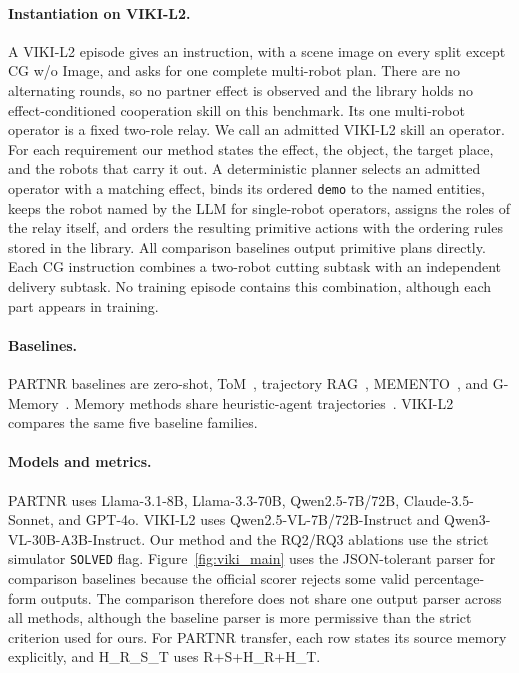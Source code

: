\documentclass{article}
\theoremstyle{plain}
\theoremstyle{definition}
\theoremstyle{remark}
\begin{document}
\paragraph{Instantiation on VIKI-L2.}
A VIKI-L2 episode gives an instruction, with a scene image on every split except CG w/o Image, and asks for one complete multi-robot plan. There are no alternating rounds, so no partner effect is observed and the library holds no effect-conditioned cooperation skill on this benchmark. Its one multi-robot operator is a fixed two-role relay. We call an admitted VIKI-L2 skill an operator. For each requirement our method states the effect, the object, the target place, and the robots that carry it out. A deterministic planner selects an admitted operator with a matching effect, binds its ordered \texttt{demo} to the named entities, keeps the robot named by the LLM for single-robot operators, assigns the roles of the relay itself, and orders the resulting primitive actions with the ordering rules stored in the library. All comparison baselines output primitive plans directly. Each CG instruction combines a two-robot cutting subtask with an independent delivery subtask. No training episode contains this combination, although each part appears in training.
 
 
\paragraph{Baselines.}
PARTNR baselines are zero-shot, ToM~\citep{li2023theory}, trajectory RAG~\citep{lewis2020retrieval}, MEMENTO~\citep{kwon2026memento}, and G-Memory~\citep{zhang2025g}. Memory methods share heuristic-agent trajectories~\citep{PARTNR}. VIKI-L2 compares the same five baseline families.
 
\paragraph{Models and metrics.}
PARTNR uses Llama-3.1-8B, Llama-3.3-70B, Qwen2.5-7B/72B, Claude-3.5-Sonnet, and GPT-4o. VIKI-L2 uses Qwen2.5-VL-7B/72B-Instruct and Qwen3-VL-30B-A3B-Instruct. Our method and the RQ2/RQ3 ablations use the strict simulator \texttt{SOLVED} flag. Figure~\ref{fig:viki_main} uses the JSON-tolerant parser for comparison baselines because the official scorer rejects some valid percentage-form outputs. The comparison therefore does not share one output parser across all methods, although the baseline parser is more permissive than the strict criterion used for ours. For PARTNR transfer, each row states its source memory explicitly, and H\_R\_S\_T uses R+S+H\_R+H\_T.
 
\end{document}
